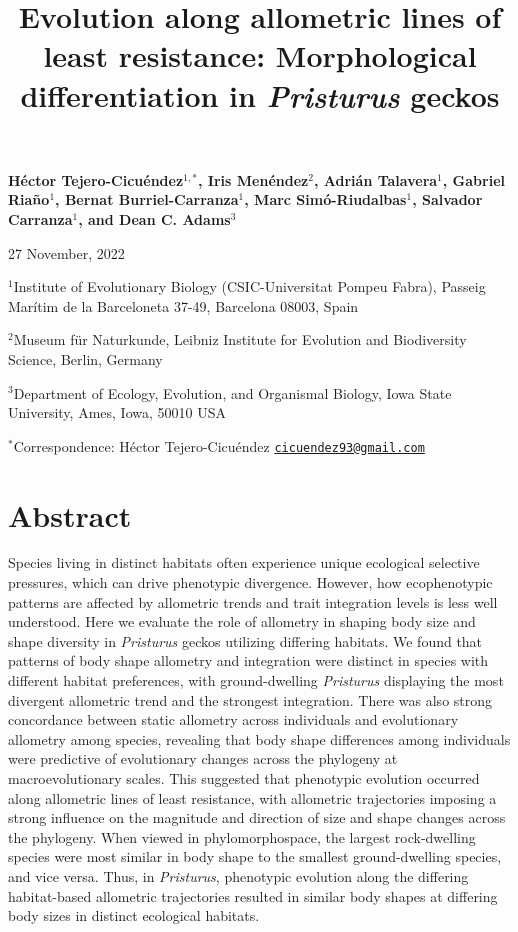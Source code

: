 \documentclass[
  11pt,
]{article}
\title{Evolution along allometric lines of least resistance:
Morphological differentiation in \emph{Pristurus} geckos}
\author{}
\date{\vspace{-2.5em}}
\begin{document}
\maketitle

\begin{center}
\textbf{H{\'{e}}ctor Tejero-Cicu{\'{e}}ndez$^{1,*}$,  Iris Men{\'{e}}ndez$^{2}$, Adri{\'{a}}n Talavera$^{1}$, Gabriel Riaño$^{1}$, Bernat Burriel-Carranza$^{1}$, Marc Sim{\'{o}}-Riudalbas$^{1}$, Salvador Carranza$^{1}$, and Dean C. Adams$^{3}$}
\end{center}

\begin{center}27 November, 2022\end{center}

\(^{1}\)Institute of Evolutionary Biology (CSIC-Universitat Pompeu
Fabra), Passeig Marítim de la Barceloneta 37-49, Barcelona 08003, Spain

\(^{2}\)Museum für Naturkunde, Leibniz Institute for Evolution and
Biodiversity Science, Berlin, Germany

\(^{3}\)Department of Ecology, Evolution, and Organismal Biology, Iowa
State University, Ames, Iowa, 50010 USA

\(^{*}\)Correspondence: Héctor Tejero-Cicuéndez
\href{mailto:cicuendez93@gmail.com}{\nolinkurl{cicuendez93@gmail.com}}

\newpage

\hypertarget{abstract}{%
\section{Abstract}\label{abstract}}

Species living in distinct habitats often experience unique ecological
selective pressures, which can drive phenotypic divergence. However, how
ecophenotypic patterns are affected by allometric trends and trait
integration levels is less well understood. Here we evaluate the role of
allometry in shaping body size and shape diversity in \emph{Pristurus}
geckos utilizing differing habitats. We found that patterns of body
shape allometry and integration were distinct in species with different
habitat preferences, with ground-dwelling \emph{Pristurus} displaying
the most divergent allometric trend and the strongest integration. There
was also strong concordance between static allometry across individuals
and evolutionary allometry among species, revealing that body shape
differences among individuals were predictive of evolutionary changes
across the phylogeny at macroevolutionary scales. This suggested that
phenotypic evolution occurred along allometric lines of least
resistance, with allometric trajectories imposing a strong influence on
the magnitude and direction of size and shape changes across the
phylogeny. When viewed in phylomorphospace, the largest rock-dwelling
species were most similar in body shape to the smallest ground-dwelling
species, and vice versa. Thus, in \emph{Pristurus}, phenotypic evolution
along the differing habitat-based allometric trajectories resulted in
similar body shapes at differing body sizes in distinct ecological
habitats.
\end{document}
